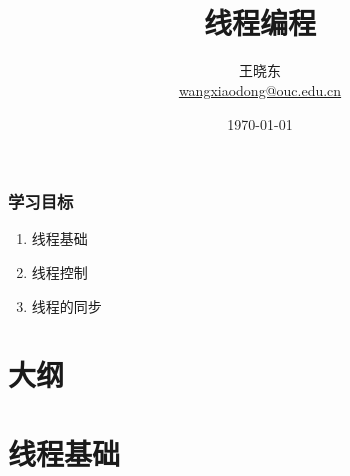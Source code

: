 
\title[KevinW@OUC]{\\  
  线程编程}
\author[王晓东]{王晓东\\
  \href{mailto:wangxiaodong@ouc.edu.cn}{\footnotesize wangxiaodong@ouc.edu.cn}}
\date{\today}


\frame{\titlepage}
\begin{frame}
  \frametitle{学习目标}
  \begin{enumerate}
    \item 线程基础
\item 线程控制
\item 线程的同步
  \end{enumerate}  
\end{frame}

\section*{大纲}

\section{线程基础}


